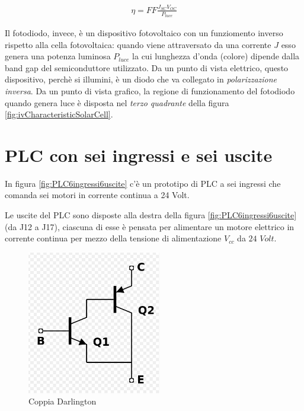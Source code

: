 \documentclass[17pt]{extarticle}
\begin{document}
\begin{eqnarray}
	\eta = FF\frac{J_{SC}V_{OC}}{P_{luce}}
\end{eqnarray}



Il fotodiodo, invece, è un dispositivo fotovoltaico con un funziomento inverso rispetto alla cella fotovoltaica: quando viene attraversato da una corrente $J$ esso genera una potenza luminosa $P_{luce}$ la cui lunghezza d'onda (colore) dipende dalla band gap del semiconduttore utilizzato. Da un punto di vista elettrico, questo dispositivo, perchè si illumini, è un diodo che va collegato in \emph{polarizzazione inversa}. Da un punto di vista grafico, la regione di funzionamento del fotodiodo quando genera luce è disposta nel \emph{terzo quadrante} della figura \ref{fig:ivCharacteristicSolarCell}.




\clearpage

\section{PLC con sei ingressi e sei uscite}

In figura \ref{fig:PLC6ingressi6uscite} c'è un prototipo di PLC a sei ingressi che comanda sei motori in corrente continua a 24 Volt. 

Le uscite del PLC sono disposte alla destra della figura \ref{fig:PLC6ingressi6uscite} (da J12 a J17), ciascuna di esse è pensata per alimentare un motore elettrico in corrente continua per mezzo della tensione di alimentazione $V_{cc}$ da $24$ $Volt$. 



\begin{figure}[b!]		
	\centering
   	\includegraphics[width=2.3in]{coppiaDarlington.png}
  	\caption{Coppia Darlington}
   	\label{fig:coppiaDarlington}
\end{figure}
\end{document}
